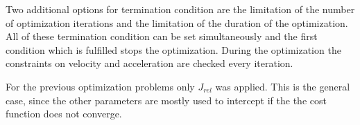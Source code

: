 Two additional options for termination condition are the limitation of the number of optimization iterations and the limitation of the duration of the optimization. All of these termination condition can be set simultaneously and the first condition which is fulfilled stops the optimization.
During the optimization the constraints on velocity and acceleration are checked every iteration. \newline

For the previous optimization problems only $J_{rel}$ was applied. This is the general case, since the other parameters are mostly used to intercept if the the cost function does not converge.










%




%
%
%
%
%










